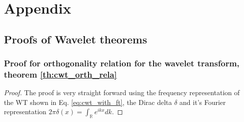\chapter{Appendix}

\section{Proofs of Wavelet theorems}

\subsection{Proof for orthogonality relation for the wavelet transform, theorem \ref{th:cwt_orth_rela}} \label{proof:cwt_orth_rela}

\begin{proof}
    The proof is very straight forward using the frequency representation of the WT shown in Eq. \ref{eq:cwt_with_ft}, the Dirac delta $\delta$ and it's Fourier representation
    $2 \pi \delta(x) = \int_{\mathbb{R}} e^{ikx} dk$.


\end{proof}
